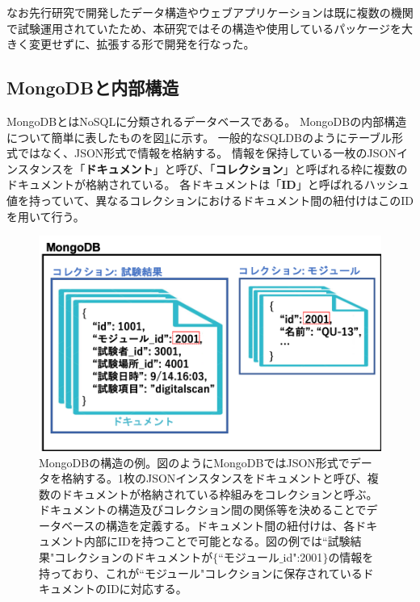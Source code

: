 なお先行研究で開発したデータ構造やウェブアプリケーションは既に複数の機関で試験運用されていたため、本研究ではその構造や使用しているパッケージを大きく変更せずに、拡張する形で開発を行なった。


\clearpage
\subsection{MongoDBと内部構造}
MongoDBとはNoSQLに分類されるデータベースである。
MongoDBの内部構造\cite{4-2}について簡単に表したものを図\ref{mongodb_schema}に示す。
一般的なSQLDBのようにテーブル形式ではなく、JSON形式で情報を格納する。
情報を保持している一枚のJSONインスタンスを「\textbf{ドキュメント}」と呼び、「\textbf{コレクション}」と呼ばれる枠に複数のドキュメントが格納されている。
各ドキュメントは「\textbf{ID}」と呼ばれるハッシュ値を持っていて、異なるコレクションにおけるドキュメント間の紐付けはこのIDを用いて行う。

\begin{figure}[bpt]\centering
\includegraphics[width=12cm]{./mongodb_schema.png}
\caption[MongoDBの構造の例]{MongoDBの構造の例。図のようにMongoDBではJSON形式でデータを格納する。1枚のJSONインスタンスをドキュメントと呼び、複数のドキュメントが格納されている枠組みをコレクションと呼ぶ。ドキュメントの構造及びコレクション間の関係等を決めることでデータベースの構造を定義する。ドキュメント間の紐付けは、各ドキュメント内部にIDを持つことで可能となる。図の例では``試験結果"コレクションのドキュメントが$\{$``モジュール$\_$id":2001$\}$の情報を持っており、これが``モジュール"コレクションに保存されているドキュメントのIDに対応する。}
\label{mongodb_schema}
\end{figure}



